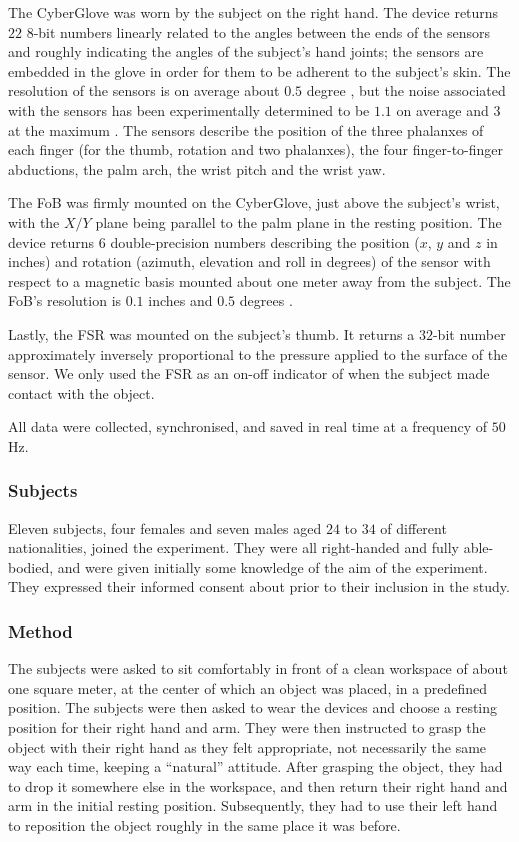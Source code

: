 The CyberGlove was worn by the subject on the right hand. The device
returns $22$ $8$-bit numbers linearly related to the angles between
the ends of the sensors and roughly indicating the angles of the
subject's hand joints; the sensors are embedded in the glove in order
for them to be adherent to the subject's skin. The resolution of the
sensors is on average about $0.5$ degree \cite{cyberglove}, but the
noise associated with the sensors has been experimentally determined
to be $1.1$ on average and $3$ at the maximum \cite{212431}. The
sensors describe the position of the three phalanxes of each finger
(for the thumb, rotation and two phalanxes), the four finger-to-finger
abductions, the palm arch, the wrist pitch and the wrist yaw.

The FoB was firmly mounted on the CyberGlove, just above the subject's
wrist, with the $X/Y$ plane being parallel to the palm plane in the
resting position. The device returns $6$ double-precision numbers
describing the position ($x$, $y$ and $z$ in inches) and rotation
(azimuth, elevation and roll in degrees) of the sensor with respect to
a magnetic basis mounted about one meter away from the subject. The
FoB's resolution is $0.1$ inches and $0.5$ degrees \cite{fob}.

Lastly, the FSR was mounted on the subject's thumb. It returns a
$32$-bit number approximately inversely proportional to the pressure
applied to the surface of the sensor. We only used the FSR as an
on-off indicator of when the subject made contact with the object.

All data were collected, synchronised, and saved in real time at a
frequency of $50$Hz.

\subsubsection*{Subjects}

Eleven subjects, four females and seven males aged $24$ to $34$ of
different nationalities, joined the experiment. They were all
right-handed and fully able-bodied, and were given initially some
knowledge of the aim of the experiment. They expressed their informed
consent about prior to their inclusion in the study.

\subsubsection*{Method}

The subjects were asked to sit comfortably in front of a clean
workspace of about one square meter, at the center of which an object
was placed, in a predefined position. The subjects were then asked to
wear the devices and choose a resting position for their right hand
and arm. They were then instructed to grasp the object with their
right hand as they felt appropriate, not necessarily the same way each
time, keeping a ``natural'' attitude. After grasping the object, they
had to drop it somewhere else in the workspace, and then return their
right hand and arm in the initial resting position. Subsequently, they
had to use their left hand to reposition the object roughly in the
same place it was before.

